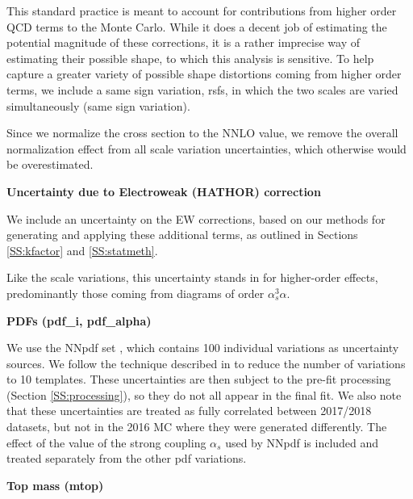 This standard practice is meant to account for contributions from higher order QCD terms to the Monte Carlo. While it does a decent job of estimating the potential magnitude of these corrections, it is a rather imprecise way of estimating their possible shape, to which this analysis is sensitive. To help capture a greater variety of possible shape distortions coming from higher order terms, we include a same sign variation, rsfs, in which the two scales are varied simultaneously (same sign variation).

Since we normalize the cross section to the NNLO value, we remove the overall normalization effect from all scale variation uncertainties, which otherwise would be overestimated. 

\par \noindent
\textbf{Uncertainty due to Electroweak (HATHOR) correction} 

We include an uncertainty on the EW corrections, based on our methods for generating and applying these additional terms, as outlined in Sections \ref{SS:kfactor} and \ref{SS:statmeth}.

Like the scale variations, this uncertainty stands in for higher-order effects, predominantly those coming from diagrams of order $\alpha_s^3 \alpha$. 

\par \noindent
\textbf{PDFs (pdf\_i, pdf\_alpha)}

We use the NNpdf set \cite{NNPDF}, which contains 100 individual variations as uncertainty sources.  We follow the technique described in \cite{ytnote} to reduce the number of variations to 10 templates. These uncertainties are then subject to the pre-fit processing (Section \ref{SS:processing}), so they do not all appear in the final fit. We also note that these uncertainties are treated as fully correlated between 2017/2018 datasets, but not in the 2016 MC where they were generated differently.
The effect of the value of the strong coupling $\alpha_s$ used by NNpdf is included and treated separately from the other pdf variations.

\par \noindent
\textbf{Top mass (mtop)}

